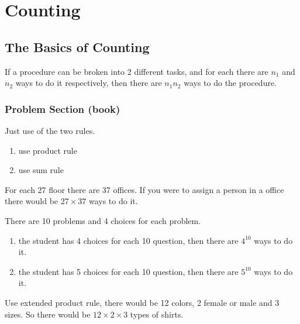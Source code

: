 \chapter{Counting}

\section{The Basics of Counting}

\newcommand{\productrule}{
    \begin{definition}
        If a procedure can be broken into 2 different tasks, and for each there are $n_1$ and $n_2$ ways to do it respectively, then there are $n_1n_2$ ways to do the procedure.
    \end{definition}
}

\productrule

\subsection{Problem Section (book)}

\begin{exercise}
    Just use of the two rules.
    \begin{enumerate}
        \item use product rule       
        \item use sum rule
    \end{enumerate}
\end{exercise}


\begin{exercise}
    For each 27 floor there are 37 offices. If you were to assign a person in a office there would be $27 \times 37$ ways to do it.
\end{exercise}

\begin{exercise}
    There are 10 problems and 4 choices for each problem.
    \begin{enumerate}
        \item the student has 4 choices for each 10 question, then there are $4^{10}$ ways to do it.    
        \item the student has 5 choices for each 10 question, then there are $5^10$ ways to do it.
    \end{enumerate}
\end{exercise}

\begin{exercise}
    Use extended product rule, there would be 12 colors, 2 female or male and 3 sizes. So there would be $12 \times 2 \times 3$ types of shirts.
\end{exercise}

